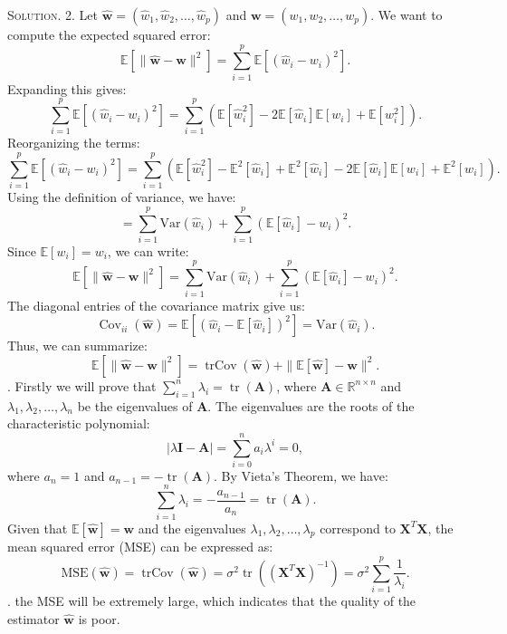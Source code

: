 \documentclass[12pt, a4paper, oneside]{ctexart}
\newenvironment{solution}{\par\noindent\textsc{Solution. }}{\\\par}
\begin{document}
\begin{solution}
	2. Let \(\hat{\mathbf{w}} = (\hat{w}_1, \hat{w}_2, \dots, \hat{w}_p)\) and \(\mathbf{w} = (w_1, w_2, \dots, w_p)\). We want to compute the expected squared error:
	\[
	\mathbb{E}[\|\hat{\mathbf{w}} - \mathbf{w}\|^2] = \sum_{i = 1}^{p} \mathbb{E}[(\hat{w}_i - w_i)^2].
	\]
	Expanding this gives:
	\[
	\sum_{i = 1}^{p} \mathbb{E}[(\hat{w}_i - w_i)^2] = \sum_{i = 1}^{p} \left( \mathbb{E}[\hat{w}_i^2] - 2\mathbb{E}[\hat{w}_i]\mathbb{E}[w_i] + \mathbb{E}[w_i^2] \right).
	\]
	Reorganizing the terms:
	\[
	\sum_{i = 1}^{p} \mathbb{E}[(\hat{w}_i - w_i)^2] = \sum_{i = 1}^{p} \left( \mathbb{E}[\hat{w}_i^2] - \mathbb{E}^2[\hat{w}_i] + \mathbb{E}^2[\hat{w}_i] - 2\mathbb{E}[\hat{w}_i]\mathbb{E}[w_i] + \mathbb{E}^2[w_i] \right).
	\]
	Using the definition of variance, we have:
	\[
	= \sum_{i = 1}^{p} \text{Var}(\hat{w}_i) + \sum_{i = 1}^{p} (\mathbb{E}[\hat{w}_i] - w_i)^2.
	\]
	Since \(\mathbb{E}[w_i] = w_i\), we can write:
	\[
	\mathbb{E}[\|\hat{\mathbf{w}} - \mathbf{w}\|^2] = \sum_{i = 1}^{p} \text{Var}(\hat{w}_i) + \sum_{i = 1}^{p} (\mathbb{E}[\hat{w}_i] - w_i)^2.
	\]
	The diagonal entries of the covariance matrix give us:
	\[
	\operatorname{Cov}_{ii}(\hat{\mathbf{w}}) = \mathbb{E}[(\hat{w}_i - \mathbb{E}[\hat{w}_i])^2] = \text{Var}(\hat{w}_i).
	\]
	Thus, we can summarize:
	\[
	\mathbb{E}[\|\hat{\mathbf{w}} - \mathbf{w}\|^2] = \operatorname{trCov}(\hat{\mathbf{w}}) + \|\mathbb{E}[\hat{\mathbf{w}}] - \mathbf{w}\|^2.
	\]
	\newline{}. Firstly we will prove that $\sum_{i = 1}^{n} \lambda_i = \operatorname{tr}(\mathbf{A})$, where \(\mathbf{A} \in \mathbb{R}^{n \times n}\) and \(\lambda_1, \lambda_2, \ldots, \lambda_n\) be the eigenvalues of \(\mathbf{A}\). The eigenvalues are the roots of the characteristic polynomial:
	\[
	|\lambda \mathbf{I} - \mathbf{A}| = \sum_{i = 0}^{n} a_i \lambda^i = 0,
	\]
	where \(a_n = 1\) and \(a_{n - 1} = -\operatorname{tr}(\mathbf{A})\). By Vieta's Theorem, we have:
	\[
	\sum_{i = 1}^{n} \lambda_i = -\frac{a_{n - 1}}{a_n} = \operatorname{tr}(\mathbf{A}).
	\]
	Given that \(\mathbb{E}[\hat{\mathbf{w}}] = \mathbf{w}\) and the eigenvalues \(\lambda_1, \lambda_2, \ldots, \lambda_{p}\) correspond to \(\mathbf{X}^{T} \mathbf{X}\), the mean squared error (MSE) can be expressed as:
	\[
	\text{MSE}(\hat{\mathbf{w}}) = \operatorname{trCov}(\hat{\mathbf{w}}) = \sigma^2 \operatorname{tr}((\mathbf{X}^{T}\mathbf{X})^{-1}) = \sigma^2 \sum_{i = 1}^{p} \frac{1}{\lambda_i}.
	\]
	\newline{}. the MSE will be extremely large, which indicates that the quality of the estimator \(\hat{\mathbf{w}}\) is poor. 
\end{solution}
\end{document}
